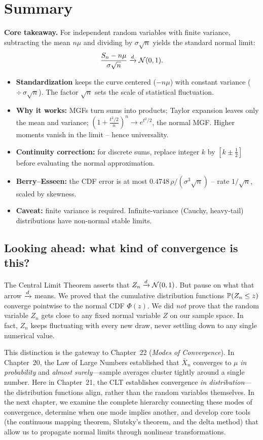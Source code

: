 \section{Summary}
\label{ch21:summary}

\begin{focusbox}
\textbf{Core takeaway.} For independent random variables with finite variance,
subtracting the mean $n\mu$ and dividing by $\sigma\sqrt n$ yields the standard normal limit:
\[
  \frac{S_n - n\mu}{\sigma\sqrt n} \dto \Normal(0,1).
\]
\begin{itemize}
\item \textbf{Standardization} keeps the curve centered ($-n\mu$) with constant variance
($\div\,\sigma\sqrt n$). The factor $\sqrt n$ sets the scale of statistical fluctuation.
\item \textbf{Why it works:} MGFs turn sums into products; Taylor expansion leaves only
the mean and variance; $(1 + \frac{t^2/2}{n})^n \to e^{t^2/2}$, the normal MGF. Higher
moments vanish in the limit -- hence universality.
\item \textbf{Continuity correction:} for discrete sums, replace integer $k$ by
$[k \pm \tfrac12]$ before evaluating the normal approximation.
\item \textbf{Berry--Esseen:} the CDF error is at most $0.4748\,\rho/(\sigma^3\sqrt n)$
-- rate $1/\sqrt n$, scaled by skewness.
\item \textbf{Caveat:} finite variance is required. Infinite-variance (Cauchy,
heavy-tail) distributions have non-normal stable limits.
\end{itemize}
\end{focusbox}

\subsection*{Looking ahead: what kind of convergence is this?}
The Central Limit Theorem asserts that $Z_n \dto \Normal(0,1)$. But pause on what that
arrow $\dto$ means. We proved that the cumulative distribution functions
$\P(Z_n \le z)$ converge pointwise to the normal CDF $\Phi(z)$. We did \emph{not} prove
that the random variable $Z_n$ gets close to any fixed normal variable $Z$ on our sample
space. In fact, $Z_n$ keeps fluctuating with every new draw, never settling down to any
single numerical value.

This distinction is the gateway to Chapter~22 (\emph{Modes of Convergence}). In Chapter~20,
the Law of Large Numbers established that $\bar X_n$ converges to $\mu$ \emph{in probability}
and \emph{almost surely}---sample averages cluster tightly around a single number.
Here in Chapter~21, the CLT establishes convergence \emph{in distribution}---the
distribution functions align, rather than the random variables themselves. In the next chapter,
we examine the complete hierarchy connecting these modes of convergence, determine when one mode
implies another, and develop core tools (the continuous mapping theorem, Slutsky's theorem,
and the delta method) that allow us to propagate normal limits through nonlinear transformations.

